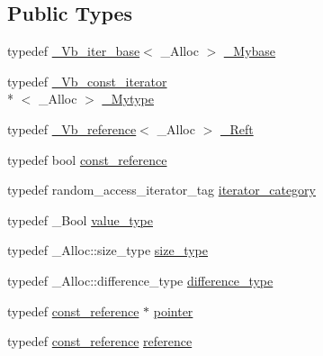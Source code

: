 \subsection*{Public Types}
\begin{DoxyCompactItemize}
\item 
typedef \hyperlink{class___vb__iter__base}{\+\_\+\+Vb\+\_\+iter\+\_\+base}$<$ \+\_\+\+Alloc $>$ \hyperlink{class___vb__const__iterator_af4d51819174094e3576a3b45a3e3702f}{\+\_\+\+Mybase}
\item 
typedef \hyperlink{class___vb__const__iterator}{\+\_\+\+Vb\+\_\+const\+\_\+iterator}\\*
$<$ \+\_\+\+Alloc $>$ \hyperlink{class___vb__const__iterator_acab47f643a88497fc0bb9c74afc59fde}{\+\_\+\+Mytype}
\item 
typedef \hyperlink{class___vb__reference}{\+\_\+\+Vb\+\_\+reference}$<$ \+\_\+\+Alloc $>$ \hyperlink{class___vb__const__iterator_a9955dddb0c1346eacd54df1c2cc6e628}{\+\_\+\+Reft}
\item 
typedef bool \hyperlink{class___vb__const__iterator_a7115c71f1b57c74be5291ce71b94b101}{const\+\_\+reference}
\item 
typedef random\+\_\+access\+\_\+iterator\+\_\+tag \hyperlink{class___vb__const__iterator_aa81c954de1d156ee1cc846296d52d38a}{iterator\+\_\+category}
\item 
typedef \+\_\+\+Bool \hyperlink{class___vb__const__iterator_a8b63263ffd9490c057e4c63ae5e4a586}{value\+\_\+type}
\item 
typedef \+\_\+\+Alloc\+::size\+\_\+type \hyperlink{class___vb__const__iterator_ab4d2e8e7d079361dd5e50ac335420b09}{size\+\_\+type}
\item 
typedef \+\_\+\+Alloc\+::difference\+\_\+type \hyperlink{class___vb__const__iterator_a5966ee8cd6e57759253addfa4821de91}{difference\+\_\+type}
\item 
typedef \hyperlink{class___vb__const__iterator_a7115c71f1b57c74be5291ce71b94b101}{const\+\_\+reference} $\ast$ \hyperlink{class___vb__const__iterator_a2da9762fd4a47847dc3901d172b86263}{pointer}
\item 
typedef \hyperlink{class___vb__const__iterator_a7115c71f1b57c74be5291ce71b94b101}{const\+\_\+reference} \hyperlink{class___vb__const__iterator_a15c6fa96bc01a672faec26fbaa7279f4}{reference}
\end{DoxyCompactItemize}
